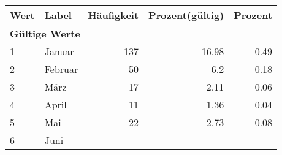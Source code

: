      \begin{longtable}{lXrrr}
     \toprule
     \textbf{Wert} & \textbf{Label} & \textbf{Häufigkeit} & \textbf{Prozent(gültig)} & \textbf{Prozent} \\
     \endhead
     \midrule
     \multicolumn{5}{l}{\textbf{Gültige Werte}}\\

     1 &
     \multicolumn{1}{X}{ Januar   } &


       \num{137} &
       \num[round-mode=places,round-precision=2]{16.98} &
         \num[round-mode=places,round-precision=2]{0.49} \\

     2 &
     \multicolumn{1}{X}{ Februar   } &


       \num{50} &
       \num[round-mode=places,round-precision=2]{6.2} &
         \num[round-mode=places,round-precision=2]{0.18} \\

     3 &
     \multicolumn{1}{X}{ März   } &


       \num{17} &
       \num[round-mode=places,round-precision=2]{2.11} &
         \num[round-mode=places,round-precision=2]{0.06} \\

     4 &
     \multicolumn{1}{X}{ April   } &


       \num{11} &
       \num[round-mode=places,round-precision=2]{1.36} &
         \num[round-mode=places,round-precision=2]{0.04} \\

     5 &
     \multicolumn{1}{X}{ Mai   } &


       \num{22} &
       \num[round-mode=places,round-precision=2]{2.73} &
         \num[round-mode=places,round-precision=2]{0.08} \\

     6 &
     \multicolumn{1}{X}{ Juni   } &



\end{longtable}
